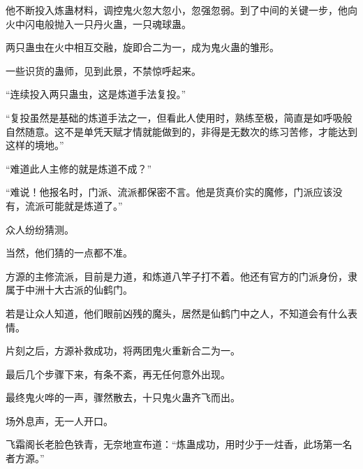 \begin{this_body}
他不断投入炼蛊材料，调控鬼火忽大忽小，忽强忽弱。到了中间的关键一步，他向火中闪电般抛入一只丹火蛊，一只魂球蛊。

两只蛊虫在火中相互交融，旋即合二为一，成为鬼火蛊的雏形。

一些识货的蛊师，见到此景，不禁惊呼起来。

“连续投入两只蛊虫，这是炼道手法复投。”

“复投虽然是基础的炼道手法之一，但看此人使用时，熟练至极，简直是如呼吸般自然随意。这不是单凭天赋才情就能做到的，非得是无数次的练习苦修，才能达到这样的境地。”

“难道此人主修的就是炼道不成？”

“难说！他报名时，门派、流派都保密不言。他是货真价实的魔修，门派应该没有，流派可能就是炼道了。”

众人纷纷猜测。

当然，他们猜的一点都不准。

方源的主修流派，目前是力道，和炼道八竿子打不着。他还有官方的门派身份，隶属于中洲十大古派的仙鹤门。

若是让众人知道，他们眼前凶残的魔头，居然是仙鹤门中之人，不知道会有什么表情。

片刻之后，方源补救成功，将两团鬼火重新合二为一。

最后几个步骤下来，有条不紊，再无任何意外出现。

最终鬼火哗的一声，骤然散去，十只鬼火蛊齐飞而出。

场外息声，无一人开口。

飞霜阁长老脸色铁青，无奈地宣布道：“炼蛊成功，用时少于一炷香，此场第一名者方源。”

\end{this_body}


